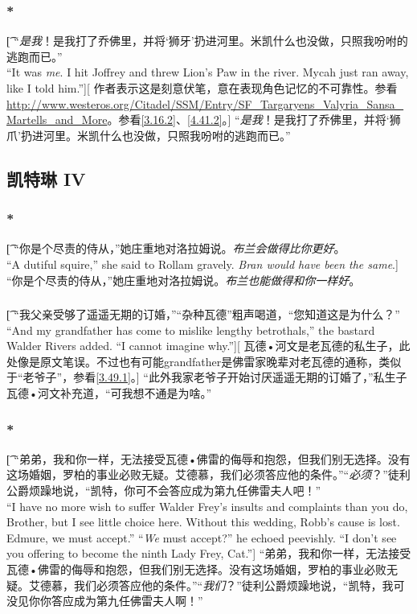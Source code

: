 \documentclass[12pt,a4paper]{article}
\begin{document}
\subsubsection{\color{red}*}\label{3.34.1}\t[	
	“\emph{是我}！是我打了乔佛里，并将‘狮牙’扔进河里。米凯什么也没做，只照我吩咐的逃跑而已。”\\
	“It was \emph{me}. I hit Joffrey and threw Lion's Paw in the river. Mycah just ran away, like I told him.”][
	作者表示这是刻意伏笔，意在表现角色记忆的不可靠性。参看\url{http://www.westeros.org/Citadel/SSM/Entry/SF_Targaryens_Valyria_Sansa_Martells_and_More}。参看\ref{3.16.2}、\ref{4.41.2}。]
	“\emph{是我}！是我打了乔佛里，并将‘狮爪’扔进河里。米凯什么也没做，只照我吩咐的逃跑而已。”
	
\subsection{凯特琳 IV}
\subsubsection{\color{red}*}\t[
	“你是个尽责的侍从，”她庄重地对洛拉姆说。\emph{布兰会做得比你更好}。\\
	“A dutiful squire,” she said to Rollam gravely. \emph{Bran would have been the same}.]
	“你是个尽责的侍从，”她庄重地对洛拉姆说。\emph{布兰也能做得和你一样好}。
	
	
\subsubsection{}\t[	
	“我父亲受够了遥遥无期的订婚，”“杂种瓦德”粗声喝道，“您知道这是为什么？”\\
	“And my grandfather has come to mislike lengthy betrothals,” the bastard Walder Rivers added. “I cannot imagine why.”][
	瓦德•河文是老瓦德的私生子，此处像是原文笔误。不过也有可能grandfather是佛雷家晚辈对老瓦德的通称，类似于“老爷子”，参看\ref{3.49.1}。]
	“此外我家老爷子开始讨厌遥遥无期的订婚了，”私生子瓦德•河文补充道，“可我想不通是为啥。”
		
\subsubsection{\color{red}*}\t[
	“弟弟，我和你一样，无法接受瓦德•佛雷的侮辱和抱怨，但我们别无选择。没有这场婚姻，罗柏的事业必败无疑。艾德慕，我们必须答应他的条件。”“\emph{必须}？”徒利公爵烦躁地说，“凯特，你可不会答应成为第九任佛雷夫人吧！”\\
	“I have no more wish to suffer Walder Frey's insults and complaints than you do, Brother, but I see little choice here. Without this wedding, Robb's cause is lost. Edmure, we must accept.” “\emph{We} must accept?” he echoed peevishly. “I don't see you offering to become the ninth Lady Frey, Cat.”]
	“弟弟，我和你一样，无法接受瓦德•佛雷的侮辱和抱怨，但我们别无选择。没有这场婚姻，罗柏的事业必败无疑。艾德慕，我们必须答应他的条件。”“\emph{我们}？”徒利公爵烦躁地说，“凯特，我可没见你你答应成为第九任佛雷夫人啊！”
	
\end{document}
